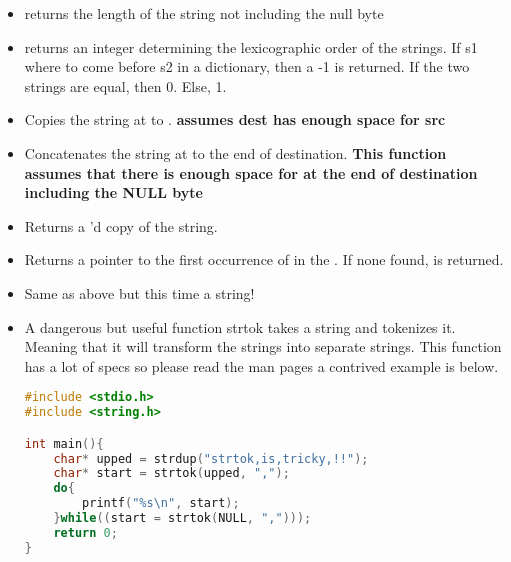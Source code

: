 \begin{itemize}

	\item {} returns the length of the string not including the null byte

	\item {} returns an integer determining the lexicographic order of the strings. If s1 where to come before s2 in a dictionary, then a -1 is returned. If the two strings are equal, then 0. Else, 1.

	\item {} Copies the string at  to . \textbf{assumes dest has enough space for src}

	\item {} Concatenates the string at  to the end of destination. \textbf{This function assumes that there is enough space for  at the end of destination including the NULL byte}

	\item {} Returns a 'd copy of the string.

	\item {} Returns a pointer to the first occurrence of  in the . If none found,  is returned.

	\item {} Same as above but this time a string!

	\item {}

	  A dangerous but useful function strtok takes a string and tokenizes it.
    Meaning that it will transform the strings into separate strings.
    This function has a lot of specs so please read the man pages a contrived example is below.

	      \begin{lstlisting}[language=C]
#include <stdio.h>
#include <string.h>

int main(){
    char* upped = strdup("strtok,is,tricky,!!");
    char* start = strtok(upped, ",");
    do{
        printf("%s\n", start);
    }while((start = strtok(NULL, ",")));
    return 0;
}
\end{lstlisting}


\end{itemize}
